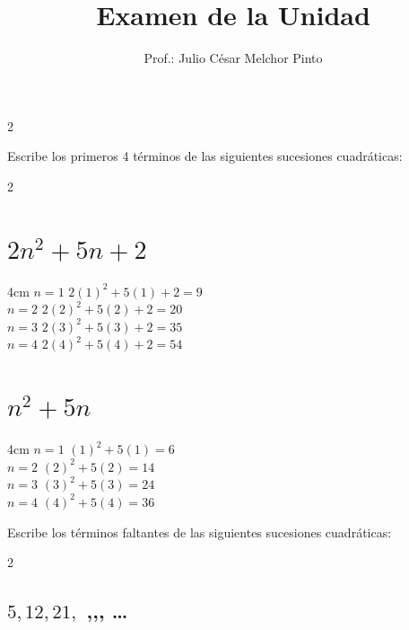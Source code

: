 \documentclass[12pt,addpoints,answers]{evalua}
\title{Examen de la Unidad}
\author{Prof.: Julio César Melchor Pinto}
\begin{document}
\begin{multicols}{2}
    
    
\end{multicols}
\begin{questions}\large
    \question[10] Escribe los primeros 4 términos de las siguientes sucesiones cuadráticas:

    \begin{multicols}{2}
        \begin{parts}
            \part { \Large$2n^2+5n+2$} \hfill \fillin[$9,20,35,54$][0cm]

            \begin{solutionbox}{4cm}
                $n=1$ \quad $2(1)^2+5(1)+2=9$ \\
                $n=2$ \quad $2(2)^2+5(2)+2=20$ \\
                $n=3$ \quad $2(3)^2+5(3)+2=35$ \\
                $n=4$ \quad $2(4)^2+5(4)+2=54$
            \end{solutionbox}

            \part {\Large $n^2+5n$} \hfill \fillin[$6,14,24,36$][0cm]

            \begin{solutionbox}{4cm}
                $n=1$ \quad $(1)^2+5(1)=6$ \\
                $n=2$ \quad $(2)^2+5(2)=14$ \\
                $n=3$ \quad $(3)^2+5(3)=24$ \\
                $n=4$ \quad $(4)^2+5(4)=36$
            \end{solutionbox}
        \end{parts}
    \end{multicols}

    \question[10] Escribe los términos faltantes de las siguientes sucesiones cuadráticas:

    \begin{multicols}{2}
        \begin{parts}
            \part { \Large$5,12,21,$ \fillin[32][0.5cm],\fillin[45][0.5cm],\fillin[60][0.5cm], \dots}


\end{parts}
\end{multicols}
\end{questions}
\end{document}
